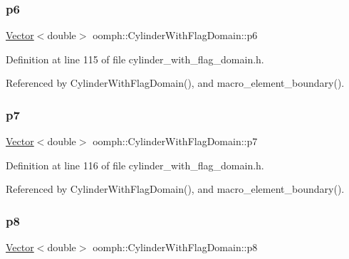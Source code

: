 \subsubsection{\texorpdfstring{p6}{p6}}
{\footnotesize\ttfamily \hyperlink{classoomph_1_1Vector}{Vector}$<$double$>$ oomph\+::\+Cylinder\+With\+Flag\+Domain\+::p6\hspace{0.3cm}{\ttfamily [private]}}



Definition at line 115 of file cylinder\+\_\+with\+\_\+flag\+\_\+domain.\+h.



Referenced by Cylinder\+With\+Flag\+Domain(), and macro\+\_\+element\+\_\+boundary().

\mbox{\label{classoomph_1_1CylinderWithFlagDomain_ae0aaa23dad312e7ea308e98b59015a51}} 
\subsubsection{\texorpdfstring{p7}{p7}}
{\footnotesize\ttfamily \hyperlink{classoomph_1_1Vector}{Vector}$<$double$>$ oomph\+::\+Cylinder\+With\+Flag\+Domain\+::p7\hspace{0.3cm}{\ttfamily [private]}}



Definition at line 116 of file cylinder\+\_\+with\+\_\+flag\+\_\+domain.\+h.



Referenced by Cylinder\+With\+Flag\+Domain(), and macro\+\_\+element\+\_\+boundary().

\mbox{\label{classoomph_1_1CylinderWithFlagDomain_a20743a18902498e2537f557da2fec123}} 
\subsubsection{\texorpdfstring{p8}{p8}}
{\footnotesize\ttfamily \hyperlink{classoomph_1_1Vector}{Vector}$<$double$>$ oomph\+::\+Cylinder\+With\+Flag\+Domain\+::p8\hspace{0.3cm}{\ttfamily [private]}}



